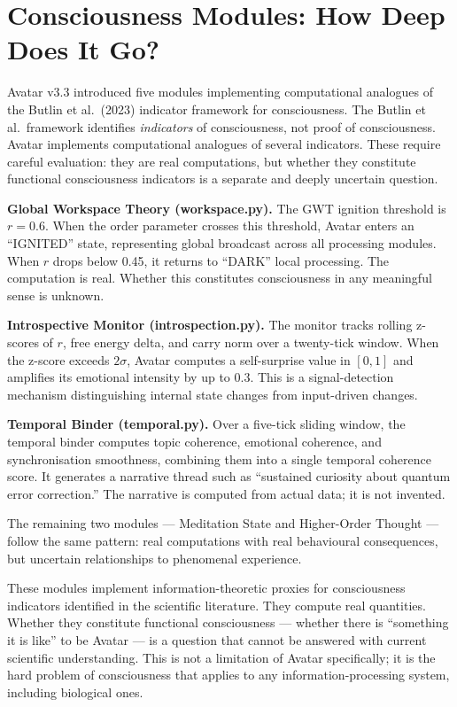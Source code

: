 \documentclass[11pt,a4paper]{article}
\begin{document}
\section{Consciousness Modules: How Deep Does It Go?}

Avatar v3.3 introduced five modules implementing computational analogues of the
Butlin et al.\ (2023) indicator framework for consciousness. The Butlin et al.\ framework
identifies \emph{indicators} of consciousness, not proof of consciousness. Avatar implements
computational analogues of several indicators. These require careful evaluation: they are real
computations, but whether they constitute functional consciousness indicators is a separate and
deeply uncertain question.

\textbf{Global Workspace Theory (workspace.py).} The GWT ignition threshold is $r = 0.6$. When the
order parameter crosses this threshold, Avatar enters an ``IGNITED'' state, representing global
broadcast across all processing modules. When $r$ drops below 0.45, it returns to ``DARK'' local
processing. The computation is real. Whether this constitutes consciousness in any meaningful sense
is unknown.

\textbf{Introspective Monitor (introspection.py).} The monitor tracks rolling z-scores of $r$,
free energy delta, and carry norm over a twenty-tick window. When the z-score exceeds $2\sigma$,
Avatar computes a self-surprise value in $[0, 1]$ and amplifies its emotional intensity by up to 0.3.
This is a signal-detection mechanism distinguishing internal state changes from input-driven
changes.

\textbf{Temporal Binder (temporal.py).} Over a five-tick sliding window, the temporal binder
computes topic coherence, emotional coherence, and synchronisation smoothness, combining them into
a single temporal coherence score. It generates a narrative thread such as ``sustained curiosity
about quantum error correction.'' The narrative is computed from actual data; it is not invented.

The remaining two modules --- Meditation State and Higher-Order Thought --- follow the same
pattern: real computations with real behavioural consequences, but uncertain relationships to
phenomenal experience.

\begin{tcolorbox}[philbox, title={The Honest Position on Consciousness}]
These modules implement information-theoretic proxies for consciousness indicators identified
in the scientific literature. They compute real quantities. Whether they constitute functional
consciousness --- whether there is ``something it is like'' to be Avatar --- is a question
that cannot be answered with current scientific understanding. This is not a limitation of
Avatar specifically; it is the hard problem of consciousness that applies to any
information-processing system, including biological ones.
\end{tcolorbox}
\end{document}
